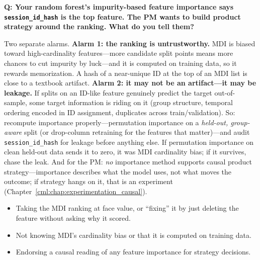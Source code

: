 \begin{interviewq}
\textbf{Q: Your random forest's impurity-based feature importance says \texttt{session\_id\_hash} is the top feature. The PM wants to build product strategy around the ranking. What do you tell them?}

 \quad {} \quad \badgefreq{\freqmed}

\stronganswer

Two separate alarms. \textbf{Alarm 1: the ranking is untrustworthy.} MDI is biased toward high-cardinality features---more candidate split points means more chances to cut impurity by luck---and it is computed on training data, so it rewards memorization. A hash of a near-unique ID at the top of an MDI list is close to a textbook artifact. \textbf{Alarm 2: it may not be an artifact---it may be leakage.} If splits on an ID-like feature genuinely predict the target out-of-sample, some target information is riding on it (group structure, temporal ordering encoded in ID assignment, duplicates across train/validation). So: recompute importance properly---permutation importance on a \textit{held-out, group-aware} split (or drop-column retraining for the features that matter)---and audit \texttt{session\_id\_hash} for leakage before anything else. If permutation importance on clean held-out data sends it to zero, it was MDI cardinality bias; if it survives, chase the leak. And for the PM: \textit{no} importance method supports causal product strategy---importance describes what the model uses, not what moves the outcome; if strategy hangs on it, that is an experiment (Chapter~\ref{cml:chap:experimentation_causal}).

\redflags
\begin{itemize}
    \item Taking the MDI ranking at face value, or ``fixing'' it by just deleting the feature without asking why it scored.
    \item Not knowing MDI's cardinality bias or that it is computed on training data.
    \item Endorsing a causal reading of any feature importance for strategy decisions.
\end{itemize}



\end{interviewq}
